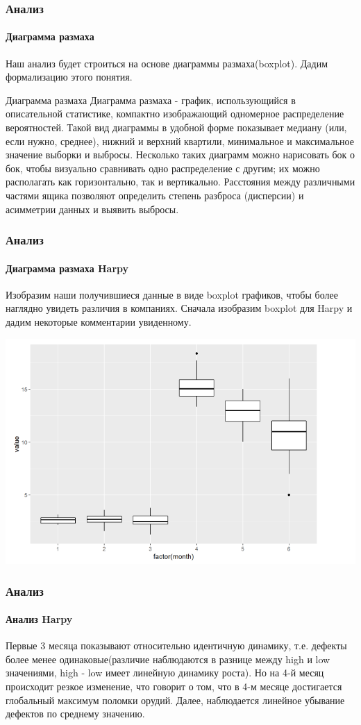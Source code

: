 \documentclass{beamer}
\begin{document}
\begin{frame}
\begin{flushleft}
\frametitle{Анализ}
\framesubtitle{Диаграмма размаха}
\small{Наш анализ будет строиться на основе диаграммы размаха(boxplot). Дадим формализацию этого понятия.}
\begin{block}{Диаграмма размаха}
\scriptsize{Диаграмма размаха - график, использующийся в описательной статистике, компактно изображающий одномерное распределение вероятностей. Такой вид диаграммы в удобной форме показывает медиану (или, если нужно, среднее), нижний и верхний квартили, минимальное и максимальное значение выборки и выбросы. Несколько таких диаграмм можно нарисовать бок о бок, чтобы визуально сравнивать одно распределение с другим; их можно располагать как горизонтально, так и вертикально. Расстояния между различными частями ящика позволяют определить степень разброса (дисперсии) и асимметрии данных и выявить выбросы.}
\end{block}
\end{flushleft}
\end{frame}

\begin{frame}
\begin{flushleft}
\frametitle{Анализ}
\framesubtitle{Диаграмма размаха Harpy}
\small{Изобразим наши получившиеся данные в виде boxplot графиков, чтобы более
наглядно увидеть различия в компаниях. Сначала изобразим boxplot для Harpy и дадим некоторые комментарии увиденному.}
\end{flushleft}
\includegraphics[width=1\linewidth]{images/image4.png}
\end{frame}

\begin{frame}
\begin{flushleft}
\frametitle{Анализ}
\framesubtitle{Анализ Harpy}
\small{Первые 3 месяца показывают относительно идентичную динамику, т.е. дефекты более менее одинаковые(различие наблюдаются в разнице между high и low значениями, high - low имеет линейную динамику роста). Но на 4-й месяц происходит резкое изменение, что говорит о том, что в 4-м месяце достигается глобальный максимум поломки орудий. Далее, наблюдается линейное убывание дефектов по среднему значению.}
\end{flushleft}
\end{frame}
\end{document}
